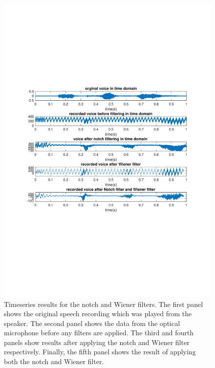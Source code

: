 \documentclass[paper-main.tex]{subfiles}
\begin{document}
\begin{figure}
\begin{center}
\includegraphics[width=\textwidth,trim={1cm 8.2cm 1 8.3cm},clip]{figures/timeSeriesNotchWiener.pdf}
\end{center}
\caption{\label{fig:timeNotchWiener}
Timeseries results for the notch and Wiener filters. 
The first panel shows the original speech recording which was played from the speaker. 
The second panel shows the data from the optical microphone before any filters are applied. 
The third and fourth panels show results after applying the notch and Wiener filter respectively. 
Finally, the fifth panel shows the result of applying both the notch and Wiener filter. 
}
\end{figure}
\end{document}
